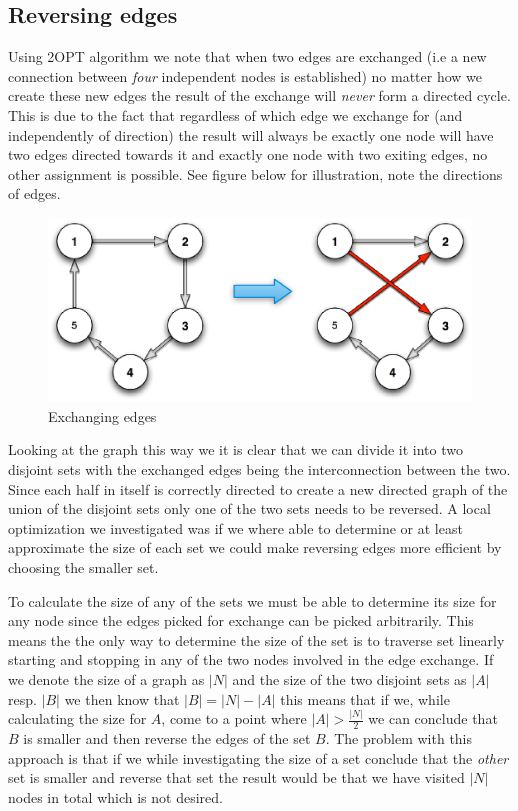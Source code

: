 \documentclass[a4paper,12pt,oneside]{article}
\begin{document}
\subsection{Reversing edges}
Using 2OPT algorithm we note that when two edges are exchanged (i.e a new connection between \textit{four} independent nodes is established) no matter how we create these new edges the result of the exchange will \textit{never} form a directed cycle. This is due to the fact that regardless of which edge we exchange for (and independently of direction) the result will always be exactly one node will have two edges directed towards it and exactly one node with two exiting edges, no other assignment is possible. See figure below for illustration, note the directions of edges.

\begin{figure}[h]
	\begin{center}
		\includegraphics[width=0.90\linewidth]{rev_edge_graph.eps}
	\end{center}
	\caption{Exchanging edges}
	\label{exchange}
\end{figure}


Looking at the graph this way we it is clear that we can divide it into two disjoint sets with the exchanged edges being the interconnection between the two. Since each half in itself is correctly directed to create a new directed graph of the union of the disjoint sets only one of the two sets needs to be reversed. A local optimization we investigated was if we where able to determine or at least approximate the size of each set we could make reversing edges more efficient by choosing the smaller set. 

To calculate the size of any of the sets we must be able to determine its size for any node since the edges picked for exchange can be picked arbitrarily. This means the the only way to determine the size of the set is to traverse set linearly starting and stopping in any of the two nodes involved in the edge exchange. If we denote the size of a graph as $|N|$ and the size of the two disjoint sets as $|A|$ resp. $|B|$ we then know that $|B| = |N| - |A|$ this means that if we, while calculating the size for $A$, come to a point where $|A| > \frac{|N|}{2}$ we can conclude that $B$ is smaller and then reverse the edges of the set $B$. The problem with this approach is that if we while investigating the size of a set conclude that the \textit{other} set is smaller and reverse that set the result would be that we have visited $|N|$ nodes in total which is not desired. 
\end{document}
